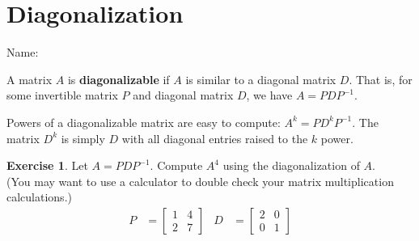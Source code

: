 \documentclass[10pt]{book}
\newcommand{\boxcolor}{gray!30}
\newenvironment{boxme}{\begin{mdframed}[backgroundcolor=\boxcolor,linewidth=0pt,nobreak=true]}{\end{mdframed}}
\newenvironment{boxdef}{\begin{mdframed}[backgroundcolor=\boxcolor,linewidth=0pt,nobreak=true]}{\end{mdframed}}
\theoremstyle{definition}
\newtheorem{exercise}{Exercise}[section]
\newcommand{\name}[1][2.5in]{\vspace{-2.3em}\hfill Name: \underline{\hspace{#1}}}
\begin{document}


\newpage


\section{Diagonalization}
\name

\begin{boxdef}
	A matrix $A$ is \textbf{diagonalizable} if $A$ is similar to a diagonal matrix $D$. That is, for some invertible matrix $P$ and diagonal matrix $D$, we have $A=PDP^{-1}$.
\end{boxdef}
\vspace{-1em}
\begin{boxme}
	Powers of a diagonalizable matrix are easy to compute: $A^k = PD^kP^{-1}$.
	The matrix $D^k$ is simply $D$ with all diagonal entries raised to the $k$ power.
\end{boxme}


\begin{exercise} %
	Let $A=PDP^{-1}$. Compute $A^4$ using the diagonalization of $A$. \\
	(You may want to use a calculator to double check your matrix multiplication calculations.)
	\begin{align*}
	P &= \begin{bmatrix}1&4\\2&7\end{bmatrix} &
	D &= \begin{bmatrix}2&0\\0&1\end{bmatrix}%
	\end{align*}
\end{exercise}
\vfill
\end{document}
